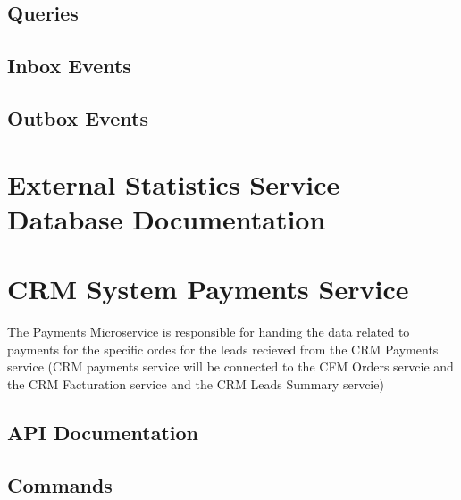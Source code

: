 \documentclass[letterpaper,10pt,english]{sphinxmanual}
\begin{document}
\subsection{Queries}
\label{\detokenize{crm_system/external_statistics_service:queries}}

\subsection{Inbox Events}
\label{\detokenize{crm_system/external_statistics_service:inbox-events}}

\subsection{Outbox Events}
\label{\detokenize{crm_system/external_statistics_service:outbox-events}}

\section{External Statistics Service Database Documentation}
\label{\detokenize{crm_system/external_statistics_service:external-statistics-service-database-documentation}}
\sphinxstepscope


\section{CRM System Payments Service}
\label{\detokenize{crm_system/payments_service:crm-system-payments-service}}\label{\detokenize{crm_system/payments_service::doc}}
\sphinxAtStartPar
The  Payments Microservice is responsible for handing the data related to payments for the specific ordes for the leads recieved from the CRM Payments service (CRM payments service will be connected to the CFM Orders servcie and the CRM Facturation service and the CRM Leads Summary servcie)



\subsection{API Documentation}
\label{\detokenize{crm_system/payments_service:api-documentation}}

\subsection{Commands}
\label{\detokenize{crm_system/payments_service:commands}}
\end{document}
